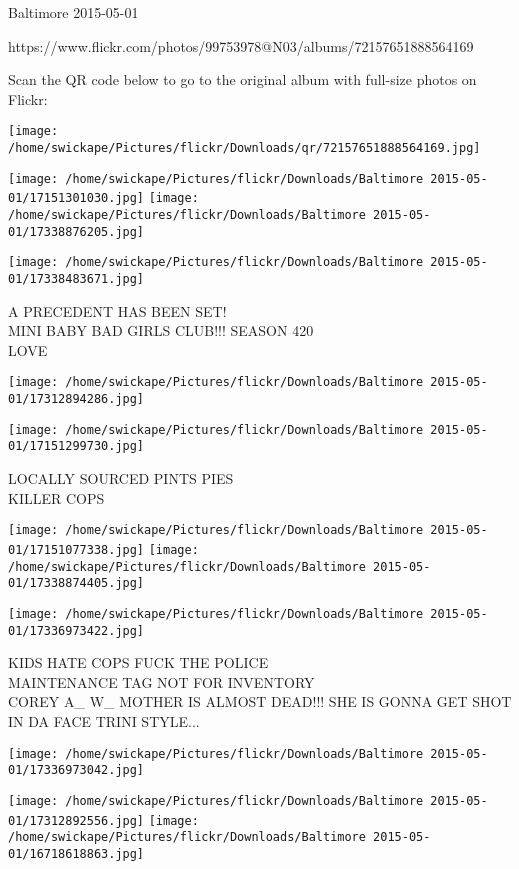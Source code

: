 \documentclass[10pt,letterpaper]{article}
\begin{document}
Baltimore 2015-05-01

https://www.flickr.com/photos/99753978@N03/albums/72157651888564169

Scan the QR code below to go to the original album with full-size photos on Flickr:

\texttt{[image: /home/swickape/Pictures/flickr/Downloads/qr/72157651888564169.jpg]}
\pagebreak

\texttt{[image: /home/swickape/Pictures/flickr/Downloads/Baltimore 2015-05-01/17151301030.jpg]}
\texttt{[image: /home/swickape/Pictures/flickr/Downloads/Baltimore 2015-05-01/17338876205.jpg]}

\texttt{[image: /home/swickape/Pictures/flickr/Downloads/Baltimore 2015-05-01/17338483671.jpg]}

A PRECEDENT HAS BEEN SET!\\
MINI BABY BAD GIRLS CLUB!!! SEASON 420\\
LOVE
\pagebreak

\texttt{[image: /home/swickape/Pictures/flickr/Downloads/Baltimore 2015-05-01/17312894286.jpg]}

\vspace{0.25in}
\texttt{[image: /home/swickape/Pictures/flickr/Downloads/Baltimore 2015-05-01/17151299730.jpg]}

LOCALLY SOURCED PINTS PIES\\
KILLER COPS
\pagebreak

\texttt{[image: /home/swickape/Pictures/flickr/Downloads/Baltimore 2015-05-01/17151077338.jpg]}
\texttt{[image: /home/swickape/Pictures/flickr/Downloads/Baltimore 2015-05-01/17338874405.jpg]}

\vspace{0.25in}
\texttt{[image: /home/swickape/Pictures/flickr/Downloads/Baltimore 2015-05-01/17336973422.jpg]}

KIDS HATE COPS FUCK THE POLICE\\
MAINTENANCE TAG NOT FOR INVENTORY\\
COREY A\_ W\_ MOTHER IS ALMOST DEAD!!!  SHE IS GONNA GET SHOT IN DA FACE TRINI STYLE...
\pagebreak

\texttt{[image: /home/swickape/Pictures/flickr/Downloads/Baltimore 2015-05-01/17336973042.jpg]}

\vspace{0.25in}
\texttt{[image: /home/swickape/Pictures/flickr/Downloads/Baltimore 2015-05-01/17312892556.jpg]}
\texttt{[image: /home/swickape/Pictures/flickr/Downloads/Baltimore 2015-05-01/16718618863.jpg]}
\end{document}

